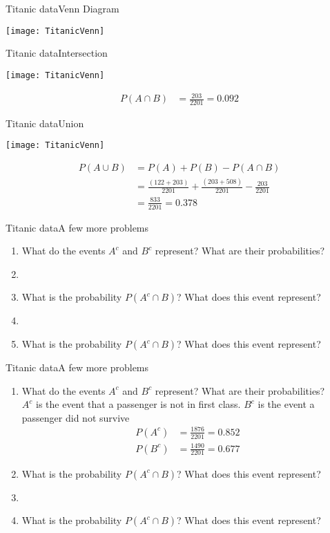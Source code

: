 \documentclass[xcolor=dvipsnames]{beamer}
\begin{document}
\begin{frame}{Titanic data}{Venn Diagram}
	\begin{center}
		\texttt{[image: TitanicVenn]}
	\end{center}
\end{frame}

\begin{frame}{Titanic data}{Intersection}
\begin{center}
	\texttt{[image: TitanicVenn]}
\end{center}
\begin{align*}
P(A \cap B) &= \frac{203}{2201} = 0.092 
\end{align*}
\end{frame}

\begin{frame}{Titanic data}{Union}
\begin{center}
	\texttt{[image: TitanicVenn]}
\end{center}
\begin{align*}
	P(A \cup B) &= P(A) + P(B) - P(A\cap B)\\ 
	&= \frac{(122 + 203)}{2201} + \frac{(203 + 508)}{2201} - \frac{203}{2201} \\ 
	&= \frac{833}{2201} = 0.378
\end{align*}
\end{frame}

\begin{frame}{Titanic data}{A few more problems}
	\begin{enumerate}
		\item What do the events $A^c$ and $B^c$ represent? What are their probabilities? 
		\item[]
		\item What is the probability $P(A^c \cap B)$? What does this event represent? 
		\item[] 
		\item What is the probability $P(A^c \cap B)$? What does this event represent?
	\end{enumerate}
\end{frame}

\begin{frame}{Titanic data}{A few more problems}
\begin{enumerate}
	\item What do the events $A^c$ and $B^c$ represent? What are their probabilities?\\
	$A^c$ is the event that a passenger is not in first class. $B^c$ is the event a passenger did not survive \pause
	\begin{align*}
		P(A^c) &= \frac{1876}{2201} = 0.852 \\
		P(B^c) &= \frac{1490}{2201} = 0.677
	\end{align*}
	\item What is the probability $P(A^c \cap B)$? What does this event represent? 
	\item[] 
	\item What is the probability $P(A^c \cap B)$? What does this event represent?
\end{enumerate}
\end{frame}
\end{document}
